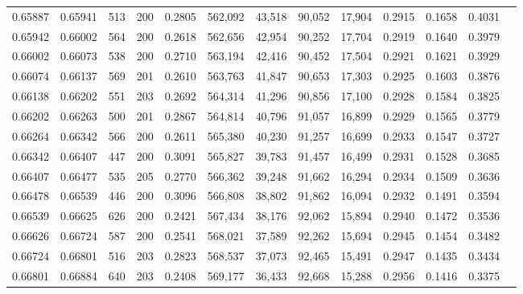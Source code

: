 \begin{tabular}{rrrrrrrrrrrrr}
0.65887 & 0.65941 &   513 & 200 &                                     0.2805 & 562,092 &  43,518 &  90,052 &  17,904 & 0.2915 & 0.1658 & 0.4031 \\
0.65942 & 0.66002 &   564 & 200 &                                     0.2618 & 562,656 &  42,954 &  90,252 &  17,704 & 0.2919 & 0.1640 & 0.3979 \\
0.66002 & 0.66073 &   538 & 200 &                                     0.2710 & 563,194 &  42,416 &  90,452 &  17,504 & 0.2921 & 0.1621 & 0.3929 \\
0.66074 & 0.66137 &   569 & 201 &                                     0.2610 & 563,763 &  41,847 &  90,653 &  17,303 & 0.2925 & 0.1603 & 0.3876 \\
0.66138 & 0.66202 &   551 & 203 &                                     0.2692 & 564,314 &  41,296 &  90,856 &  17,100 & 0.2928 & 0.1584 & 0.3825 \\
0.66202 & 0.66263 &   500 & 201 &                                     0.2867 & 564,814 &  40,796 &  91,057 &  16,899 & 0.2929 & 0.1565 & 0.3779 \\
0.66264 & 0.66342 &   566 & 200 &                                     0.2611 & 565,380 &  40,230 &  91,257 &  16,699 & 0.2933 & 0.1547 & 0.3727 \\
0.66342 & 0.66407 &   447 & 200 &                                     0.3091 & 565,827 &  39,783 &  91,457 &  16,499 & 0.2931 & 0.1528 & 0.3685 \\
0.66407 & 0.66477 &   535 & 205 &                                     0.2770 & 566,362 &  39,248 &  91,662 &  16,294 & 0.2934 & 0.1509 & 0.3636 \\
0.66478 & 0.66539 &   446 & 200 &                                     0.3096 & 566,808 &  38,802 &  91,862 &  16,094 & 0.2932 & 0.1491 & 0.3594 \\
0.66539 & 0.66625 &   626 & 200 &                                     0.2421 & 567,434 &  38,176 &  92,062 &  15,894 & 0.2940 & 0.1472 & 0.3536 \\
0.66626 & 0.66724 &   587 & 200 &                                     0.2541 & 568,021 &  37,589 &  92,262 &  15,694 & 0.2945 & 0.1454 & 0.3482 \\
0.66724 & 0.66801 &   516 & 203 &                                     0.2823 & 568,537 &  37,073 &  92,465 &  15,491 & 0.2947 & 0.1435 & 0.3434 \\
0.66801 & 0.66884 &   640 & 203 &                                     0.2408 & 569,177 &  36,433 &  92,668 &  15,288 & 0.2956 & 0.1416 & 0.3375 \\

\end{tabular}

